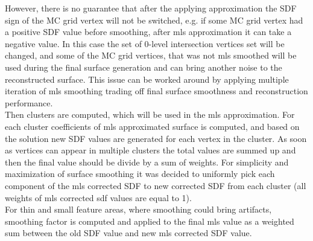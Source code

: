 However, there is no guarantee that after the applying approximation the SDF sign of the MC grid vertex will not be switched, e.g. if some MC grid vertex had a positive SDF value before smoothing, after mls approximation it can take a negative value. In this case the set of 0-level intersection vertices set will be changed, and some of the MC grid vertices, that was not mls smoothed will be used during the final surface generation and can bring another noise to the reconstructed surface. This issue can be worked around by applying multiple iteration of mls smoothing trading off final surface smoothness and reconstruction performance.\\

Then clusters are computed, which will be used in the mls approximation. For each cluster coefficients of mls approximated surface is computed, and based on the solution new SDF values are generated for each vertex in the cluster. As soon as vertices can appear in multiple clusters the total values are summed up and then the final value should be divide by a sum of weights. For simplicity and maximization of surface smoothing it was decided to uniformly pick each component of the mls corrected SDF to new corrected SDF from each cluster (all weights of mls corrected sdf values are equal to 1).\\

For thin and small feature areas, where smoothing could bring artifacts, smoothing factor is computed and applied to the final mls value as a weighted sum between the old SDF value and new mls corrected SDF value.\\

